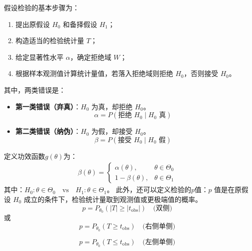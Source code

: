\documentclass[a4paper]{ctexart}
\begin{document}
假设检验的基本步骤为：
\begin{enumerate}
    \item 提出原假设 \(H_0\) 和备择假设 \(H_1\)；
    \item 构造适当的检验统计量 \(T\)；
    \item 给定显著性水平 \(\alpha\)，确定拒绝域 \(W\)；
    \item 根据样本观测值计算统计量值，若落入拒绝域则拒绝 \(H_0\)，否则接受 \(H_0\)。
\end{enumerate}
其中，两类错误是：
\begin{itemize}
    \item \textbf{第一类错误（弃真）}：\(H_0\) 为真，却拒绝 \(H_0\)。
    \begin{equation}
    \alpha = P(\text{拒绝 } H_0 \mid H_0 \text{ 真})
    \end{equation}
    
    \item \textbf{第二类错误（纳伪）}：\(H_0\) 为假，却接受 \(H_0\)。
    \begin{equation}
    \beta = P(\text{接受 } H_0 \mid H_0 \text{ 假})
    \end{equation}
\end{itemize}

定义功效函数$g(\theta)$为：
\begin{equation}
    \begin{aligned}
        \beta(\theta) = 
            \begin{cases}
                    \alpha(\theta), & \theta \in \Theta_0 \\
                    1 - \beta(\theta), & \theta \in \Theta_1
            \end{cases}
    \end{aligned}
\end{equation}
其中：$H_0: \theta \in \Theta_0 \quad \text{vs} \quad H_1: \theta \in \Theta_1$。
此外，还可以定义检验的$p$值：$p$ 值是在原假设 $H_0$ 成立的条件下，检验统计量取到观测值或更极端值的概率。
\begin{equation}
p = P_{\theta_0}(|T| \geq |t_{\text{obs}}|) \quad \text{(双侧)}
\end{equation}
或
\begin{equation}
p = P_{\theta_0}(T \geq t_{\text{obs}}) \quad \text{(右侧单侧)}
\end{equation}

\begin{equation}
p = P_{\theta_0}(T \leq t_{\text{obs}}) \quad \text{(左侧单侧)}
\end{equation}
\end{document}

